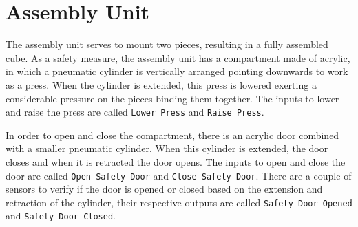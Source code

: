 \section{Assembly Unit}
\label{sec:assemblyUnit}
The assembly unit serves to mount two pieces, resulting in a fully assembled
cube. As a safety measure, the assembly unit has a compartment made of
acrylic, in which a pneumatic cylinder is vertically arranged pointing downwards
to work as a press.
When the cylinder is extended, this press is lowered exerting a considerable
pressure on the pieces binding them together.
The inputs to lower and raise the press are called \verb|Lower Press| and
\verb|Raise Press|.

In order to open and close the compartment, there is an acrylic door combined
with a smaller pneumatic cylinder. When this cylinder is extended, the door
closes and when it is retracted the door opens. The inputs to open and close the
door are called \verb|Open Safety Door| and
\verb|Close Safety Door|. There are a couple of sensors to verify if the door is
opened or closed based on the extension and retraction of the cylinder, their
respective outputs are called \verb|Safety Door Opened| and
\verb|Safety Door Closed|.

